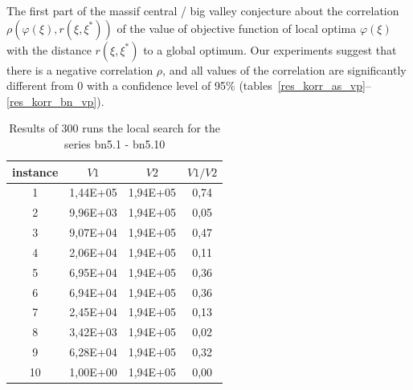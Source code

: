 \documentclass{ifacconf}
\begin{document}
The first part of the massif central / big valley conjecture about the correlation $\rho(\varphi(\xi),r(\xi,\xi^*))$ of the value of 
objective function of local optima $\varphi(\xi)$
with the distance $r(\xi,\xi^*)$ to a global optimum. 
Our experiments suggest that there is a negative correlation $\rho$, and all values of the
correlation are significantly different from 0 with a confidence level of 95\% (tables~\ref{res_korr_as_vp}--\ref{res_korr_bn_vp}).
\begin{table}[h!]
	\vspace{1cm}
	\centering
	\begin{tabular}{|c|c|c|c|}
		\hline
		\hspace*{0.1cm}instance \hspace*{0.1cm} &
		\hspace*{0.1cm}$V1$\hspace*{0.1cm}&
		\hspace*{0.1cm}$V2$\hspace*{0.1cm}&
		\hspace*{0.1cm}$V1/V2$\hspace*{0.1cm}\\
		\hline
		1 &  1,44E+05  &  1,94E+05  &  0,74\\
		2 &  9,96E+03  &  1,94E+05  &  0,05\\
		3 &  9,07E+04  &  1,94E+05  &  0,47\\
		4 &  2,06E+04  &  1,94E+05  &  0,11\\
		5 &  6,95E+04  &  1,94E+05  &  0,36\\
		6 &  6,94E+04  &  1,94E+05  &  0,36\\
		7 &  2,45E+04  &  1,94E+05  &  0,13\\
		8 &  3,42E+03  &  1,94E+05  &  0,02\\
		9 &  6,28E+04  &  1,94E+05  &  0,32\\
		10&  1,00E+00  &  1,94E+05  &  0,00\\
		\hline
	\end{tabular}
	\vspace{1em}
	\caption{Results of 300 runs the local search  for the series bn5.1 - bn5.10}	\label{spher_bn}
\end{table}
\end{document}
